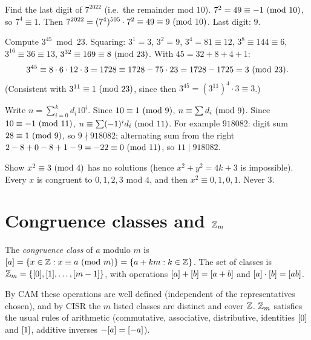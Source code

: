\begin{example}
Find the last digit of $7^{2022}$ (i.e.\ the remainder mod $10$). $7^2 = 49 \equiv -1 \ (\mathrm{mod}\ 10)$,
so $7^4 \equiv 1$. Then $7^{2022} = (7^4)^{505}\cdot 7^2 \equiv 49 \equiv 9 \ (\mathrm{mod}\ 10)$. Last
digit: $9$.
\end{example}

\begin{example}
Compute $3^{45} \bmod 23$. Squaring: $3^1 = 3$, $3^2 = 9$, $3^4 = 81 \equiv 12$,
$3^8 \equiv 144 \equiv 6$, $3^{16} \equiv 36 \equiv 13$, $3^{32} \equiv 169 \equiv 8 \ (\mathrm{mod}\ 23)$.
With $45 = 32 + 8 + 4 + 1$:
\[ 3^{45} \equiv 8 \cdot 6 \cdot 12 \cdot 3 = 1728 \equiv 1728 - 75\cdot 23 = 1728 - 1725 = 3
\ (\mathrm{mod}\ 23). \]
(Consistent with $3^{11} \equiv 1 \ (\mathrm{mod}\ 23)$, since then $3^{45} = (3^{11})^4\cdot 3\equiv 3$.)
\end{example}

\begin{example}
Write $n = \sum_{i=0}^k d_i 10^i$. Since $10 \equiv 1 \ (\mathrm{mod}\ 9)$, $n \equiv \sum d_i \ (\mathrm{mod}\ 9)$.
Since $10 \equiv -1 \ (\mathrm{mod}\ 11)$, $n \equiv \sum (-1)^i d_i \ (\mathrm{mod}\ 11)$. For example
$918082$: digit sum $28 \equiv 1 \ (\mathrm{mod}\ 9)$, so $9 \nmid 918082$; alternating sum from the right
$2 - 8 + 0 - 8 + 1 - 9 = -22 \equiv 0 \ (\mathrm{mod}\ 11)$, so $11 \mid 918082$.
\end{example}

\begin{example}
Show $x^2 \equiv 3 \ (\mathrm{mod}\ 4)$ has no solutions (hence $x^2 + y^2 = 4k + 3$ is impossible).
Every $x$ is congruent to $0,1,2,3$ mod $4$, and then $x^2 \equiv 0,1,0,1$. Never $3$.
\end{example}

\section{Congruence classes and $\mathbb{Z}_m$}

\begin{definition}
The \emph{congruence class} of $a$ modulo $m$ is $[a] = \{x \in \mathbb{Z} : x \equiv a \ (\mathrm{mod}\ m)\}
= \{a + km : k \in \mathbb{Z}\}$. The set of classes is
$\mathbb{Z}_{m} = \{[0], [1], \dots, [m-1]\}$, with operations
$[a] + [b] = [a+b]$ and $[a] \cdot [b] = [ab]$.
\end{definition}

By CAM these operations are well defined (independent of the representatives chosen), and by
CISR the $m$ listed classes are distinct and cover $\mathbb{Z}$. $\mathbb{Z}_{m}$ satisfies the usual rules of
arithmetic (commutative, associative, distributive, identities $[0]$ and $[1]$, additive
inverses $-[a] = [-a]$).

